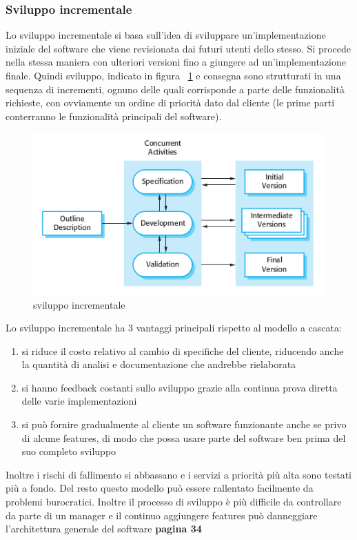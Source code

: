 \documentclass[a4paper,12pt, oneside]{book}
\begin{document}
\subsubsection{Sviluppo incrementale}
Lo sviluppo incrementale si basa sull'idea di sviluppare un'implementazione iniziale del software che viene revisionata dai futuri utenti dello stesso. Si procede nella stessa maniera con ulteriori versioni fino a giungere ad un'implementazione finale. Quindi sviluppo, indicato in figura \figurename~\ref{fig:inc} e consegna sono strutturati in una sequenza di incrementi, ognuno delle quali corrisponde a parte delle funzionalità richieste, con ovviamente un ordine di priorità dato dal cliente (le prime parti conterranno le funzionalità principali del software).
\begin{figure}
	\centering
	\includegraphics[scale=0.7]{img/inc.png}
	\caption{sviluppo incrementale \label{fig:inc} }
\end{figure}
Lo sviluppo incrementale ha 3 vantaggi principali rispetto 
al modello a cascata:
\begin{enumerate}
	\item si riduce il costo relativo al cambio di specifiche del cliente, riducendo anche la quantità di analisi e documentazione che andrebbe rielaborata
	\item si hanno feedback costanti sullo sviluppo grazie alla continua prova diretta delle varie implementazioni
	\item si può fornire gradualmente al cliente un software funzionante anche se privo di alcune features, di modo che possa usare parte del software ben prima del suo completo sviluppo
\end{enumerate}
Inoltre i rischi di fallimento si abbassano e i servizi a priorità più alta sono testati più a fondo. Del resto questo modello può essere rallentato facilmente da problemi burocratici. Inoltre il processo di sviluppo è più difficile da controllare da parte di un manager e il continuo aggiungere features può danneggiare l'architettura generale del software 
\textbf{pagina 34}
\end{document}
